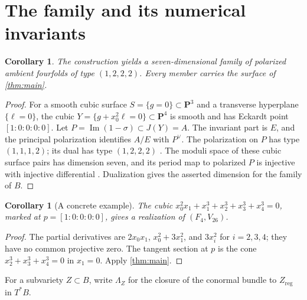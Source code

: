 \documentclass[10pt]{amsart}
\numberwithin{equation}{section}
\newtheorem{corollary}[theorem]{Corollary}
\theoremstyle{remark}
\newcommand{\PP}{\mathbf P}
\newcommand{\reg}{\mathrm{reg}}
\begin{document}
\section{The family and its numerical invariants}

\begin{corollary}\label{cor:family}
The construction yields a seven-dimensional family of polarized ambient
fourfolds of type $(1,2,2,2)$.  Every member carries the surface of
\cref{thm:main}.
\end{corollary}
\begin{proof}
For a smooth cubic surface $S=\{g=0\}\subset\PP^3$ and a transverse
hyperplane $\{\ell=0\}$, the cubic
$Y=\{g+x_0^2\ell=0\}\subset\PP^4$ is smooth and has Eckardt point
$[1:0:0:0:0]$.  Let $P=\operatorname{Im}(1-\sigma)\subset J(Y)=A$.
The invariant part is $E$, and the principal polarization identifies
$A/E$ with $P^\vee$.  The polarization on $P$ has type $(1,1,1,2)$;
its dual has type $(1,2,2,2)$
\cite[Lemma~1.12 and Remark~1.14]{CMZ2021}.
The moduli space of these cubic surface pairs has dimension seven, and
its period map to polarized $P$ is injective with injective differential
\cite[Theorem~0.1]{CMZ2021}.  Dualization gives the asserted dimension
for the family of $B$.
\end{proof}

\begin{corollary}[A concrete example]\label{cor:example}
The cubic $x_0^2x_1+x_1^3+x_2^3+x_3^3+x_4^3=0$, marked at
$p=[1:0:0:0:0]$, gives a realization of $(F_4,V_{26})$.
\end{corollary}
\begin{proof}
The partial derivatives are $2x_0x_1$, $x_0^2+3x_1^2$, and $3x_i^2$
for $i=2,3,4$; they have no common projective zero.  The tangent section
at $p$ is the cone $x_2^3+x_3^3+x_4^3=0$ in $x_1=0$.
Apply \cref{thm:main}.
\end{proof}

For a subvariety $Z\subset B$, write $\Lambda_Z$ for the closure of the
conormal bundle to $Z_{\reg}$ in $T^*B$.
\end{document}
